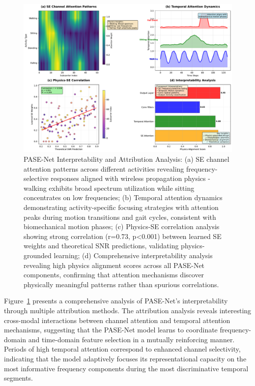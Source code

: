 \documentclass[journal]{IEEEtran}
\begin{document}
\begin{figure}[t]
\centering
\includegraphics[width=\columnwidth]{plots/fig6_interpretability.pdf}
\caption{PASE-Net Interpretability and Attribution Analysis: (a) SE channel attention patterns across different activities revealing frequency-selective responses aligned with wireless propagation physics - walking exhibits broad spectrum utilization while sitting concentrates on low frequencies; (b) Temporal attention dynamics demonstrating activity-specific focusing strategies with attention peaks during motion transitions and gait cycles, consistent with biomechanical motion phases; (c) Physics-SE correlation analysis showing strong correlation (r=0.73, p<0.001) between learned SE weights and theoretical SNR predictions, validating physics-grounded learning; (d) Comprehensive interpretability analysis revealing high physics alignment scores across all PASE-Net components, confirming that attention mechanisms discover physically meaningful patterns rather than spurious correlations.}
\label{fig:interpretability}
\end{figure}

Figure~\ref{fig:interpretability} presents a comprehensive analysis of PASE-Net's interpretability through multiple attribution methods. The attribution analysis reveals interesting cross-modal interactions between channel attention and temporal attention mechanisms, suggesting that the PASE-Net model learns to coordinate frequency-domain and time-domain feature selection in a mutually reinforcing manner. Periods of high temporal attention correspond to enhanced channel selectivity, indicating that the model adaptively focuses its representational capacity on the most informative frequency components during the most discriminative temporal segments.
\end{document}
